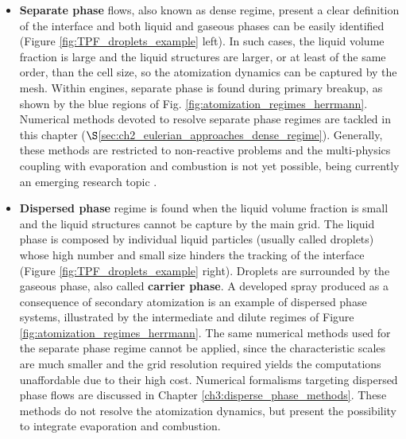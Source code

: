 

\begin{itemize}

\item \textbf{Separate phase} flows, also known as dense regime, present a clear definition of the interface and both liquid and gaseous phases can be easily identified (Figure \ref{fig:TPF_droplets_example} left). In such cases, the liquid volume fraction is large and the liquid structures are larger, or at least of the same order, than the cell size, so the atomization dynamics can be captured by the mesh. Within engines, separate phase is found during primary breakup, as shown by the blue regions of Fig. \ref{fig:atomization_regimes_herrmann}. Numerical methods devoted to resolve separate phase regimes are tackled in this chapter ($\S$\ref{sec:ch2_eulerian_approaches_dense_regime}). Generally, these methods are restricted to non-reactive problems and the multi-physics coupling with evaporation and combustion is not yet possible, being currently an emerging research topic .

\clearpage

\item \textbf{Dispersed phase} regime is found when the liquid volume fraction is small and the liquid structures cannot be capture by the main grid. The liquid phase is composed by individual liquid particles (usually called droplets) whose high number and small size hinders the tracking of the interface (Figure \ref{fig:TPF_droplets_example} right). Droplets are surrounded by the gaseous phase, also called \textbf{carrier phase}. A developed spray produced as a consequence of secondary atomization is an example of dispersed phase systems, illustrated by the intermediate and dilute regimes of Figure \ref{fig:atomization_regimes_herrmann}. The same numerical methods used for the separate phase regime cannot be applied, since the characteristic scales are much smaller and the grid resolution required yields the computations unaffordable due to their high cost. Numerical formalisms targeting dispersed phase flows are discussed in Chapter \ref{ch3:disperse_phase_methods}. These methods do not resolve the atomization dynamics, but present the possibility to integrate evaporation and combustion.

\end{itemize}


